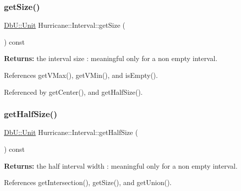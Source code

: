 \mbox{\label{classHurricane_1_1Interval_a61d877fee3986f93c357910cd63f1caa}} 
\subsubsection{\texorpdfstring{get\+Size()}{getSize()}}
{\footnotesize\ttfamily \hyperlink{group__DbUGroup_ga4fbfa3e8c89347af76c9628ea06c4146}{Db\+U\+::\+Unit} Hurricane\+::\+Interval\+::get\+Size (\begin{DoxyParamCaption}{ }\end{DoxyParamCaption}) const\hspace{0.3cm}{\ttfamily [inline]}}

{\bfseries Returns\+:} the interval size \+: meaningful only for a non empty interval. 

References get\+V\+Max(), get\+V\+Min(), and is\+Empty().



Referenced by get\+Center(), and get\+Half\+Size().

\mbox{\label{classHurricane_1_1Interval_abe66d75c0854ca0a76189801f0f7d0e3}} 
\subsubsection{\texorpdfstring{get\+Half\+Size()}{getHalfSize()}}
{\footnotesize\ttfamily \hyperlink{group__DbUGroup_ga4fbfa3e8c89347af76c9628ea06c4146}{Db\+U\+::\+Unit} Hurricane\+::\+Interval\+::get\+Half\+Size (\begin{DoxyParamCaption}{ }\end{DoxyParamCaption}) const\hspace{0.3cm}{\ttfamily [inline]}}

{\bfseries Returns\+:} the half interval width \+: meaningful only for a non empty interval. 

References get\+Intersection(), get\+Size(), and get\+Union().

\mbox{\label{classHurricane_1_1Interval_adaddabee8381860b0d6913ce39bc1911}} 
